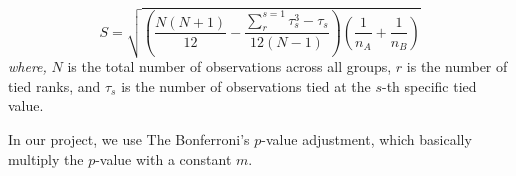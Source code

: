\begin{equation}
    S = \sqrt{(\frac{N(N+1)}{12} - \frac{\sum^{s=1}_{r} \tau^3_{s} - \tau_s}{12(N-1)})(\frac{1}{n_A} + \frac{1}{n_B})}
\end{equation}
\textit{where,} $N$ is the total number of observations across all groups, $r$ is the number of tied
ranks, and $\tau_s$ is the number of observations tied at the $s$-th specific tied value.

In our project, we use The Bonferroni's $p$-value adjustment, which basically multiply the $p$-value with a constant $m$.



